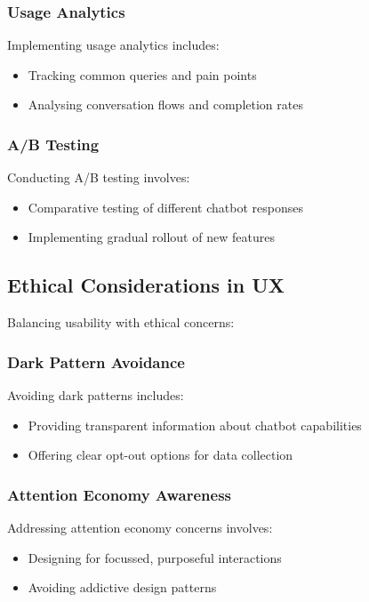 \documentclass[15pt,a4paper]{article}
\begin{document}
\begin{multicols}{2}
\subsubsection*{Usage Analytics}
Implementing usage analytics \textit{\parencite[pp. 50-100]{Beasley2023}} includes:
\begin{itemize}
    \item Tracking common queries and pain points
    \item Analysing conversation flows and completion rates
\end{itemize}

\subsubsection*{A/B Testing}
Conducting A/B testing \textit{\parencite[pp. 20-50]{Kohavi2023}} involves:
\begin{itemize}
    \item Comparative testing of different chatbot responses
    \item Implementing gradual rollout of new features
\end{itemize}

\subsection{Ethical Considerations in UX}
Balancing usability with ethical concerns:

\subsubsection*{Dark Pattern Avoidance}
Avoiding dark patterns \textit{\parencite{Brignull2023}} includes:
\begin{itemize}
    \item Providing transparent information about chatbot capabilities
    \item Offering clear opt-out options for data collection
\end{itemize}

\subsubsection*{Attention Economy Awareness}
Addressing attention economy concerns \textit{\parencite[pp. 10-30]{Williams2024}} involves:
\begin{itemize}
    \item Designing for focussed, purposeful interactions
    \item Avoiding addictive design patterns
\end{itemize}


\end{multicols}
\end{document}
